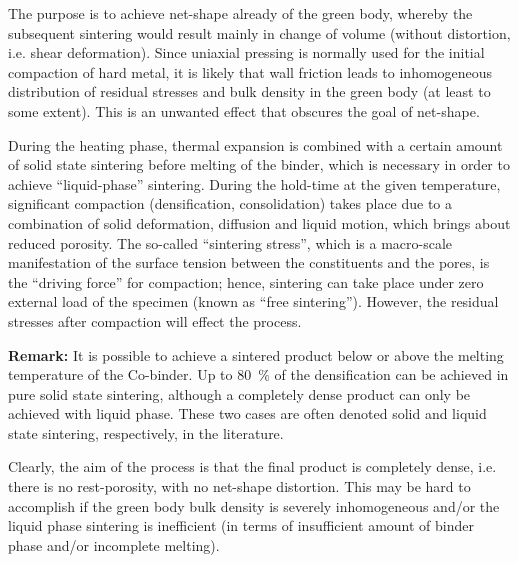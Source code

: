 \documentclass[ExampleMasters.tex]{subfiles}
\begin{document}
The purpose is to achieve net-shape already of the green body, whereby the subsequent sintering would result mainly in change of volume (without distortion, i.e. shear deformation).
Since uniaxial pressing is normally used for the initial compaction of hard metal, it is likely that wall friction leads to inhomogeneous
distribution of residual stresses and bulk density in the green body (at least to some extent).
This is an unwanted effect that obscures the goal of net-shape.

During the heating phase, thermal expansion is combined with a certain amount of solid state sintering before melting of the binder, which is necessary in order to achieve ``liquid-phase'' sintering.
During the hold-time at the given temperature, significant compaction (densification, consolidation) takes place due to a combination of solid deformation, diffusion and liquid motion, which brings about reduced porosity.
The so-called ``sintering stress'', which is a macro-scale manifestation of the surface tension between the constituents and the pores, is the ``driving force'' for compaction; hence, sintering can take place under zero external load of the specimen (known as ``free sintering'').
However, the residual stresses after compaction will effect the process.

\textbf{Remark:} It is possible to achieve a sintered product below or above the melting temperature of the Co-binder.
Up to \SI{80}{\percent} of the densification can be achieved in pure solid state sintering, although a completely dense product can only be achieved with liquid phase.
These two cases are often denoted solid and liquid state sintering, respectively, in the literature.


Clearly, the aim of the process is that the final product is completely dense, i.e. there is no rest-porosity, with no net-shape distortion.
This may be hard to accomplish if the green body bulk density is severely inhomogeneous and/or the liquid phase sintering is inefficient (in terms of insufficient amount of binder phase and/or incomplete melting).
\end{document}
